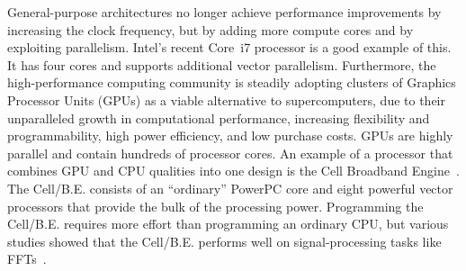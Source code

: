 \documentclass{article}
\begin{document}
General-purpose architectures no longer
achieve performance improvements by increasing the clock frequency, but
by adding more compute cores and by exploiting parallelism.  Intel's
recent Core~i7 processor is a good example of this. It has four
cores and supports additional vector parallelism.
Furthermore, the high-performance computing community is
steadily adopting clusters of Graphics Processor Units (GPUs) as a viable
alternative to supercomputers, due to their unparalleled growth in
computational performance, increasing flexibility and programmability,
high power efficiency, and low purchase costs.
GPUs are highly parallel and contain hundreds of processor cores.
An example of a processor that combines GPU and CPU
qualities into one design is the Cell Broadband Engine~\cite{cell}.
The \mbox{Cell/B.E.} consists of an ``ordinary'' PowerPC core and eight powerful
vector processors that provide the bulk of the processing power.
Programming the \mbox{Cell/B.E.} requires more effort than programming an ordinary CPU,
but various studies showed that the \mbox{Cell/B.E.} performs well on
signal-processing tasks like FFTs~\cite{fftc}.
\end{document}
